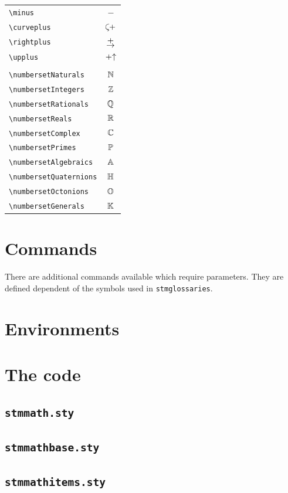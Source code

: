 \documentclass[%
  type=article,%
  layout=koma,%
  date=true,%
  hyperref=true,%
  listings=true,%
  stmmath=true,%
]{stmtext}
\begin{document}
\begin{tabularx}{\linewidth}{Xc}
\verb+\minus+ & $\minus$\\
\verb+\curveplus+ & $\curveplus$\\
\verb+\rightplus+ & $\rightplus$\\
\verb+\upplus+ & $\mathbin{+\mathord\uparrow}$\\
\\
\verb+\numbersetNaturals+ & $\mathbb{N}$\\
\verb+\numbersetIntegers+ & $\mathbb{Z}$\\
\verb+\numbersetRationals+ & $\mathbb{Q}$\\
\verb+\numbersetReals+ & $\mathbb{R}$\\
\verb+\numbersetComplex+ & $\mathbb{C}$\\
\verb+\numbersetPrimes+ & $\mathbb{P}$\\
\verb+\numbersetAlgebraics+ & $\mathbb{A}$\\
\verb+\numbersetQuaternions+ & $\mathbb{H}$\\
\verb+\numbersetOctonions+ & $\mathbb{O}$\\
\verb+\numbersetGenerals+ & $\mathbb{K}$
\end{tabularx}

\section{Commands}

There are additional commands available which require parameters. They are defined dependent of the symbols used in \texttt{stmglossaries}.

\section{Environments}

\newpage

\appendix

\newpage
\section{The code}

\subsection{\protect\texttt{stmmath.sty}}



\subsection{\protect\texttt{stmmathbase.sty}}



\subsection{\protect\texttt{stmmathitems.sty}}


\end{document}
